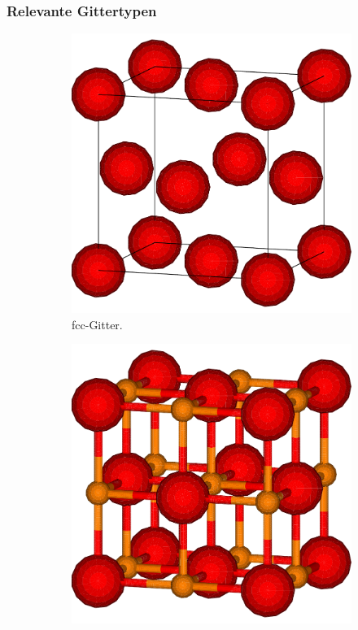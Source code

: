\subsubsection{Relevante Gittertypen}
\begin{figure}
    \centering
    \begin{subfigure}[t]{0.3\textwidth}
        \centering
        \includegraphics[width=\textwidth]{../assets/theorie/fcc.pdf}
        \caption{fcc-Gitter.} \label{fcc}
    \end{subfigure}
    \begin{subfigure}[t]{0.3\textwidth}
        \centering
        \includegraphics[width=\textwidth]{../assets/theorie/rocksalt.pdf}

\end{subfigure}
\end{figure}
